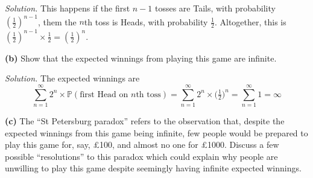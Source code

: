 \documentclass[
  a4paper,
]{book}
\theoremstyle{definition}
\theoremstyle{definition}
\theoremstyle{definition}
\theoremstyle{definition}
\theoremstyle{remark}
\begin{document}
\begin{myanswers}
\emph{Solution.}
This happens if the first \(n-1\) tosses are Tails, with probability \((\frac12)^{n-1}\), them the \(n\)th toss is Heads, with probability \(\frac12\). Altogether, this is \((\frac12)^{n-1}\times \frac12 = (\frac12)^n\).

\end{myanswers}

\textbf{(b)} Show that the expected winnings from playing this game are infinite.

\begin{myanswers}
\emph{Solution.}
The expected winnings are
\[ \sum_{n=1}^\infty 2^n \times \mathbb P(\text{first Head on $n$th toss}) = \sum_{n=1}^\infty 2^n \times \big(\tfrac12\big)^n = \sum_{n=1}^\infty 1 = \infty \]

\end{myanswers}

\textbf{(c)} The ``St Petersburg paradox'' refers to the observation that, despite the expected winnings from this game being infinite, few people would be prepared to play this game for, say, £100, and almost no one for £1000. Discuss a few possible ``resolutions'' to this paradox which could explain why people are unwilling to play this game despite seemingly having infinite expected winnings.
\end{document}
